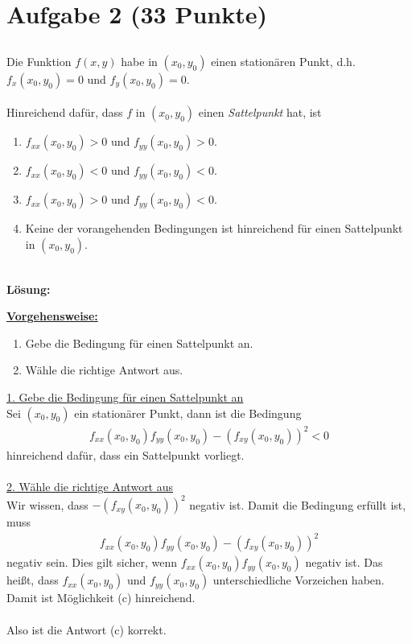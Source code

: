 \section*{Aufgabe 2 (33 Punkte)}
\vspace{0.4cm}
\subsection*{}
Die Funktion $ f(x,y) $ habe in $ (x_0,y_0) $ einen stationären Punkt, d.h. $ f_x(x_0,y_0)= 0 $ und $ f_y(x_0,y_0) = 0 $.\\
\\
Hinreichend dafür, dass $ f $ in $ (x_0,y_0) $ einen \textit{Sattelpunkt} hat, ist
\renewcommand{\labelenumi}{(\alph{enumi})}
\begin{enumerate}
	\item $ f_{xx}(x_0,y_0) > 0 $ und $ f_{yy}(x_0,y_0) >0 $.
	\item $ f_{xx}(x_0,y_0) < 0 $ und $ f_{yy}(x_0,y_0) <0 $.
	\item $ f_{xx}(x_0,y_0) > 0 $ und $ f_{yy}(x_0,y_0) <0 $.
	\item Keine der vorangehenden Bedingungen ist hinreichend für einen Sattelpunkt in $ (x_0,y_0) $.
\end{enumerate}\ \\
\textbf{Lösung:}
\begin{mdframed}
\underline{\textbf{Vorgehensweise:}}
\renewcommand{\labelenumi}{\theenumi.}
\begin{enumerate}
\item Gebe die Bedingung für einen Sattelpunkt an.
\item Wähle die richtige Antwort aus.
\end{enumerate}
\end{mdframed}

\underline{1. Gebe die Bedingung für einen Sattelpunkt an}\\
Sei $ (x_0,y_0) $ ein stationärer Punkt, dann ist die Bedingung
\begin{align*}
f_{xx}(x_0,y_0) f_{yy}(x_0,y_0) - (f_{xy}(x_0,y_0))^2 < 0
\end{align*}
hinreichend dafür, dass ein Sattelpunkt vorliegt.\\
\\
\underline{2. Wähle die richtige Antwort aus}\\
Wir wissen, dass $ - (f_{xy}(x_0,y_0))^2 $ negativ ist. Damit die Bedingung erfüllt ist, muss 
\begin{align*}
f_{xx}(x_0,y_0) f_{yy}(x_0,y_0) - (f_{xy}(x_0,y_0))^2
\end{align*}
negativ sein. Dies gilt sicher, wenn $ f_{xx}(x_0,y_0) f_{yy}(x_0,y_0) $ negativ ist.
Das heißt, dass $ f_{xx}(x_0,y_0) $ und $ f_{yy}(x_0,y_0) $ unterschiedliche Vorzeichen haben.
Damit ist Möglichkeit (c) hinreichend.\\
\\
Also ist die Antwort (c) korrekt. 
\newpage

